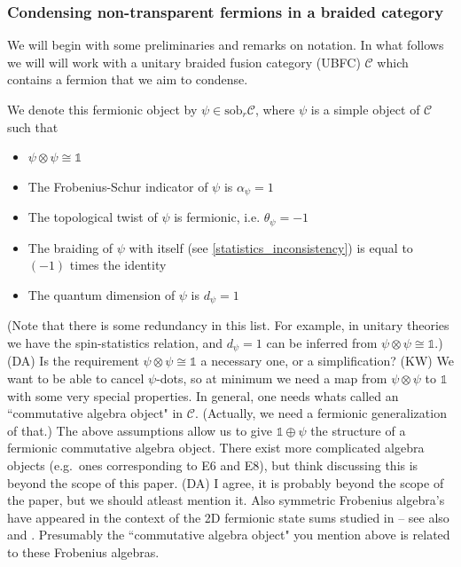 \documentclass[12pt,a4paper]{article}
\newcommand{\tp}{\otimes}
\newcommand{\unit}{\mathds{1}}
\newcommand{\mcc}{\mathcal{C}}
\newcommand{\sob}{\text{sob}_r}
\newcommand{\ot}{\otimes}
\newcommand{\kw}[1]{{\color{kwcolor}\footnotesize{(KW) #1}}}
\newcommand{\dave}[1]{{\color{ao(english)}\footnotesize{(DA) #1}}}
\begin{document}
\subsubsection{Condensing non-transparent fermions in a braided category}  \label{gntf_condense}

We will begin with some preliminaries and remarks on notation. 
In what follows we will will work with a unitary braided fusion category (UBFC) $\mathcal{C}$ which contains a fermion that we aim to condense. 

We denote this fermionic object by $\psi \in \sob\mcc$, 
where $\psi$ is a simple object of $\mcc$ such that
\begin{itemize} 
	\item $\psi\ot\psi\cong\unit$
	\item The Frobenius-Schur indicator of $\psi$ is $\alpha_\psi =1$
	\item The topological twist of $\psi$ is fermionic, i.e. $\theta_\psi =-1$
	\item The braiding of $\psi$ with itself (see \eqref{statistics_inconsistency}) is equal to $(-1)$ times the identity
	\item The quantum dimension of $\psi$ is $d_\psi=1$
\end{itemize}
(Note that there is some redundancy in this list.
For example, 
in unitary theories we have the spin-statistics relation, and $d_\psi=1$ can be inferred from $\psi\tp\psi \cong \unit$.)
\dave{Is the requirement $\psi \tp \psi \cong \unit$ a necessary one, or a simplification?}
\kw{We want to be able to cancel $\psi$-dots, so at minimum we need a map from $\psi\tp\psi$ to $\unit$ with some very special properties.
In general, one needs whats called an ``commutative algebra object" in $\mcc$.
(Actually, we need a fermionic generalization of that.)
The above assumptions allow us to give $\unit\oplus\psi$ the structure of a fermionic commutative algebra object.
There exist more complicated algebra objects (e.g.\ ones corresponding to E6 and E8),
but think discussing this is beyond the scope of this paper.}
\dave{
I agree, it is probably beyond the scope of the paper, but we should atleast mention it.
Also symmetric Frobenius algebra's have appeared in the context of the 2D fermionic state sums studied in \cite{turzillo2016} -- see also \cite{novak2015b} and \cite{Novak2015,Barrett2015}.
Presumably the ``commutative algebra object" you mention above is related to these Frobenius algebras.
}
\end{document}
